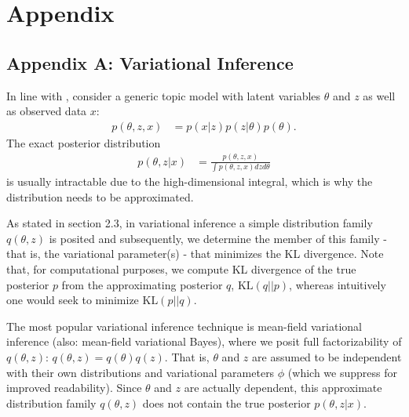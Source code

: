 \section{Appendix}

\subsection*{Appendix A: Variational Inference}

In line with \cite{wang2013variational}, consider a generic topic model with latent variables $\theta$ and $z$ as well as observed data $x$:
\begin{align*}
p(\theta,z,x) &= p(x|z)p(z|\theta)p(\theta).
\end{align*}
The exact posterior distribution
\begin{align*}
p(\theta,z|x) &= \frac{p(\theta,z,x)}{\int p(\theta,z,x)dzd\theta}
\end{align*}
is usually intractable due to the high-dimensional integral, which is why the distribution needs to be approximated.

As stated in section 2.3, in variational inference a simple distribution family $q(\theta,z)$ is posited and subsequently, we determine the member of this family - that is, the variational parameter(s) - that minimizes the KL divergence. Note that, for computational purposes, we compute KL divergence of the true posterior $p$ from the approximating posterior $q$, $\text{KL}(q||p)$, whereas intuitively one would seek to minimize $\text{KL}(p||q)$.

The most popular variational inference technique is mean-field variational inference (also: mean-field variational Bayes), where we posit full factorizability of $q(\theta,z)$: $q(\theta,z) = q(\theta)q(z)$. That is, $\theta$ and $z$ are assumed to be independent with their own distributions and variational parameters $\phi$ (which we suppress for improved readability). Since $\theta$ and $z$ are actually dependent, this approximate distribution family $q(\theta,z)$ does not contain the true posterior $p(\theta,z|x)$.  

